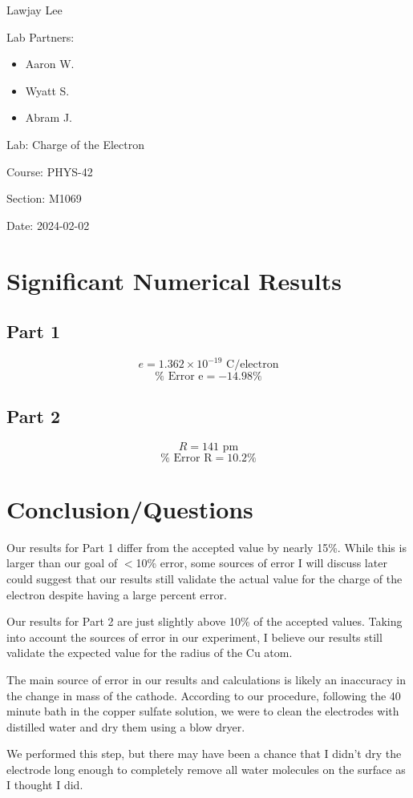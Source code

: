\documentclass[fleqn]{article}
\begin{document}
\setlength{\mathindent}{0pt}
Lawjay Lee

Lab Partners:
\begin{itemize}
	\item Aaron W.
	\item Wyatt S.
	\item Abram J.
\end{itemize}
Lab: Charge of the Electron

Course: PHYS-42

Section: M1069

Date: 2024-02-02

\section*{Significant Numerical Results}
\subsection*{Part 1}
\[ e = 1.362 \times 10^{-19} \text{ C/electron} \]
\[ \% \text{ Error e} = -14.98 \% \]

\subsection*{Part 2}
\[ R = 141 \text{ pm}\]
\[
	\% \text{ Error R} = 10.2 \%
\]

\section*{Conclusion/Questions}
Our results for Part 1 differ from the accepted value by nearly 15\%. While this is larger than our goal of $<$10\% error, some sources of error I will discuss later could suggest that our results still validate the actual value for the charge of the electron despite having a large percent error.

Our results for Part 2 are just slightly above 10\% of the accepted values. Taking into account the sources of error in our experiment, I believe our results still validate the expected value for the radius of the Cu atom.

The main source of error in our results and calculations is likely an inaccuracy in the change in mass of the cathode. According to our procedure, following the 40 minute bath in the copper sulfate solution, we were to clean the electrodes with distilled water and dry them using a blow dryer.

We performed this step, but there may have been a chance that I didn't dry the electrode long enough to completely remove all water molecules on the surface as I thought I did.
\end{document}
